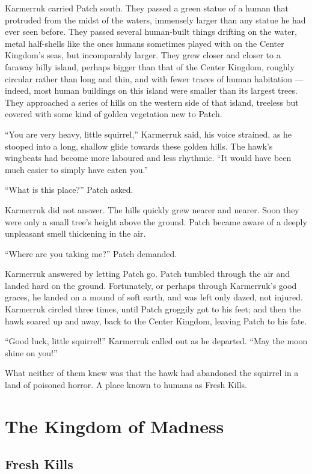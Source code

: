 \documentclass[ebook,oneside,openany,12pt]{memoir}
\begin{document}
Karmerruk carried Patch south. They passed a green statue of a human
that protruded from the midst of the waters, immensely larger than any
statue he had ever seen before. They passed several human-built things
drifting on the water, metal half-shells like the ones humans
sometimes played with on the Center Kingdom’s seas, but incomparably
larger. They grew closer and closer to a faraway hilly island, perhaps
bigger than that of the Center Kingdom, roughly circular rather than
long and thin, and with fewer traces of human habitation — indeed,
most human buildings on this island were smaller than its largest
trees. They approached a series of hills on the western side of that
island, treeless but covered with some kind of golden vegetation new
to Patch.

“You are very heavy, little squirrel,” Karmerruk said, his voice
strained, as he stooped into a long, shallow glide towards these
golden hills. The hawk’s wingbeats had become more laboured and less
rhythmic. “It would have been much easier to simply have eaten you.”

“What is this place?” Patch asked.

Karmerruk did not answer. The hills quickly grew nearer and
nearer. Soon they were only a small tree’s height above the
ground. Patch became aware of a deeply unpleasant smell thickening in
the air.

“Where are you taking me?” Patch demanded.

Karmerruk answered by letting Patch go. Patch tumbled through the air
and landed hard on the ground. Fortunately, or perhaps through
Karmerruk’s good graces, he landed on a mound of soft earth, and was
left only dazed, not injured. Karmerruk circled three times, until
Patch groggily got to his feet; and then the hawk soared up and away,
back to the Center Kingdom, leaving Patch to his fate.

“Good luck, little squirrel!” Karmerruk called out as he
departed. “May the moon shine on you!”

What neither of them knew was that the hawk had abandoned the squirrel
in a land of poisoned horror. A place known to humans as Fresh Kills.



\chapter{The Kingdom of Madness}

\section{Fresh Kills}
\end{document}
